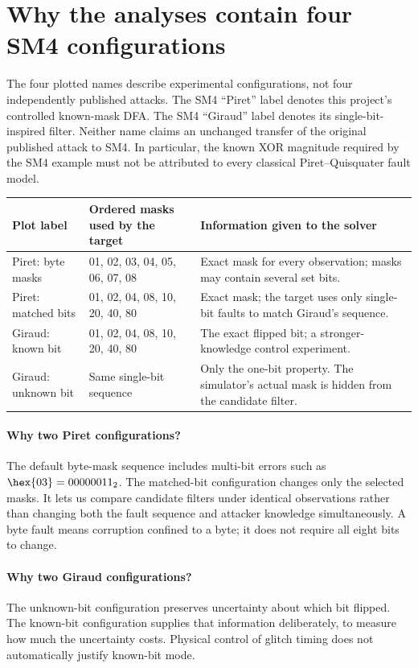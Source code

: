 \section{Why the analyses contain four SM4 configurations}
\label{sec:four_sm4_configurations}
The four plotted names describe experimental configurations, not four independently published attacks. The SM4 ``Piret'' label denotes this project's controlled known-mask DFA. The SM4 ``Giraud'' label denotes its single-bit-inspired filter. Neither name claims an unchanged transfer of the original published attack to SM4. In particular, the known XOR magnitude required by the SM4 example must not be attributed to every classical Piret--Quisquater fault model.

\begin{center}\small
\begin{tabular}{P{.23\linewidth}P{.31\linewidth}P{.34\linewidth}}\toprule
Plot label & Ordered masks used by the target & Information given to the solver\\\midrule
Piret: byte masks & 01, 02, 03, 04, 05, 06, 07, 08 & Exact mask for every observation; masks may contain several set bits.\\
Piret: matched bits & 01, 02, 04, 08, 10, 20, 40, 80 & Exact mask; the target uses only single-bit faults to match Giraud's sequence.\\
Giraud: known bit & 01, 02, 04, 08, 10, 20, 40, 80 & The exact flipped bit; a stronger-knowledge control experiment.\\
Giraud: unknown bit & Same single-bit sequence & Only the one-bit property. The simulator's actual mask is hidden from the candidate filter.\\\bottomrule
\end{tabular}\end{center}

\paragraph{Why two Piret configurations?}
The default byte-mask sequence includes multi-bit errors such as $\hex{03}=00000011_2$. The matched-bit configuration changes only the selected masks. It lets us compare candidate filters under identical observations rather than changing both the fault sequence and attacker knowledge simultaneously. A byte fault means corruption confined to a byte; it does not require all eight bits to change.

\paragraph{Why two Giraud configurations?}
The unknown-bit configuration preserves uncertainty about which bit flipped. The known-bit configuration supplies that information deliberately, to measure how much the uncertainty costs. Physical control of glitch timing does not automatically justify known-bit mode.

